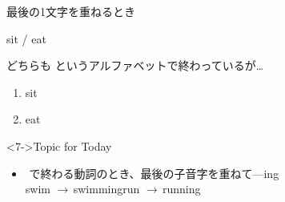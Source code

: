 \documentclass[aspectratio=169,xcolor={dvipsnames,table}]{beamer}
\begin{document}
\begin{frame}[plain]{最後の1文字を重ねるとき}
 \Large

sit / eat

どちらも\,\,というアルファベットで終わっているが\ldots

\bigskip

\begin{enumerate}
 \item<2-> sit\,\,\,\,\,\, 
 \item<2-> eat\,\,\, \hfill{}
\end{enumerate}

\bigskip
\begin{block}<7->{Topic for Today}\small
\begin{itemize}[square]
 \item {}\,\,で終わる動詞のとき、最後の子音字を重ねて---ing\,\,\dbend\,\,\dbend\\[5pt]
\hfill{swim $\rightarrow$\,swimming\hspace{15pt}run $\rightarrow$\,running}
\end{itemize}
\end{block}
\end{frame}
\end{document}

